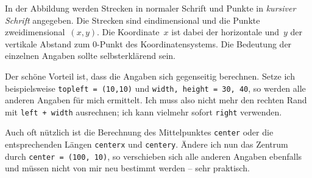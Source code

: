 %
%
%
%
%
%
%
%
%
%
%
%

%
%
%
%
%
%
%
%
%
%
%
%

In der Abbildung werden Strecken in normaler Schrift und Punkte in \textit{kursiver Schrift} angegeben. Die Strecken sind eindimensional und die Punkte zweidimensional~$(x,y)$. Die Koordinate~$x$ ist dabei der horizontale und~$y$ der vertikale Abstand zum 0-Punkt des Koordinatensystems. Die Bedeutung der einzelnen Angaben sollte selbsterklärend sein. 

Der schöne Vorteil ist, dass die Angaben sich gegenseitig berechnen. Setze ich beispielsweise \texttt{topleft = (10,10)} und \texttt{width, height = 30, 40}, so werden alle anderen Angaben für mich ermittelt. Ich muss also nicht mehr den rechten Rand mit \texttt{left + width} ausrechnen; ich kann vielmehr sofort \texttt{right} verwenden. 

Auch oft nützlich ist die Berechnung des Mittelpunktes \texttt{center} oder die entsprechenden Längen \texttt{centerx} und \texttt{centery}. Ändere ich nun das Zentrum durch \texttt{center = (100, 10)}, so verschieben sich alle anderen Angaben ebenfalls und müssen nicht von mir neu bestimmt werden -- sehr praktisch.

